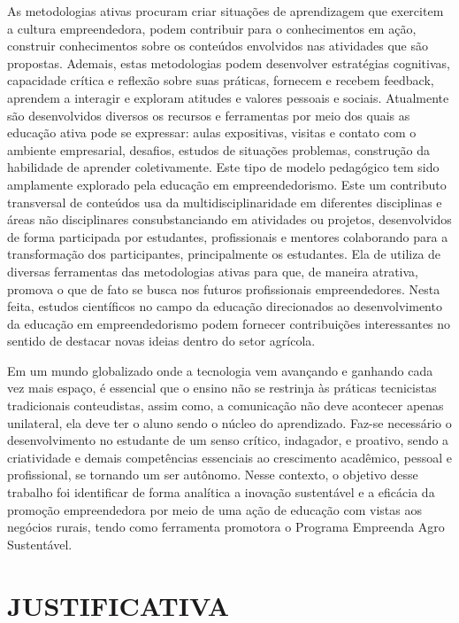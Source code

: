 As metodologias ativas procuram criar situações de aprendizagem que exercitem a cultura empreendedora, podem contribuir para o conhecimentos em ação, construir conhecimentos sobre os conteúdos envolvidos nas atividades que são propostas. Ademais, estas metodologias podem desenvolver estratégias cognitivas, capacidade crítica e reflexão sobre suas práticas, fornecem e recebem feedback, aprendem a interagir e exploram atitudes e valores pessoais e sociais. Atualmente são desenvolvidos diversos os recursos e ferramentas por meio dos quais as educação ativa pode se expressar: aulas expositivas, visitas e contato com o ambiente empresarial, desafios, estudos de situações problemas, construção da habilidade de aprender coletivamente. Este tipo de modelo pedagógico tem sido amplamente explorado pela educação em empreendedorismo. Este um contributo transversal de conteúdos usa da multidisciplinaridade em diferentes disciplinas e áreas não disciplinares consubstanciando em atividades ou projetos, desenvolvidos de forma participada por estudantes, profissionais e mentores colaborando para a transformação dos participantes, principalmente os estudantes. Ela de utiliza de diversas ferramentas das metodologias ativas para que, de maneira atrativa, promova o que de fato se busca nos futuros profissionais empreendedores. Nesta feita, estudos científicos no campo da educação direcionados ao desenvolvimento da educação em empreendedorismo podem fornecer contribuições interessantes no sentido de destacar novas ideias dentro do setor agrícola.

Em um mundo globalizado onde a tecnologia vem avançando e ganhando cada vez mais espaço, é essencial que o ensino não se restrinja às práticas tecnicistas tradicionais conteudistas, assim como, a comunicação não deve acontecer apenas unilateral, ela deve ter o aluno sendo o núcleo do aprendizado. Faz-se necessário o desenvolvimento no estudante de um senso crítico, indagador, e proativo, sendo a criatividade e demais competências essenciais ao crescimento acadêmico, pessoal e profissional, se tornando um ser autônomo. Nesse contexto, o objetivo desse trabalho foi identificar de forma analítica a inovação sustentável e a eficácia da promoção empreendedora por meio de uma ação de educação com vistas aos negócios rurais, tendo como ferramenta promotora o Programa Empreenda Agro Sustentável.



\section{JUSTIFICATIVA}

